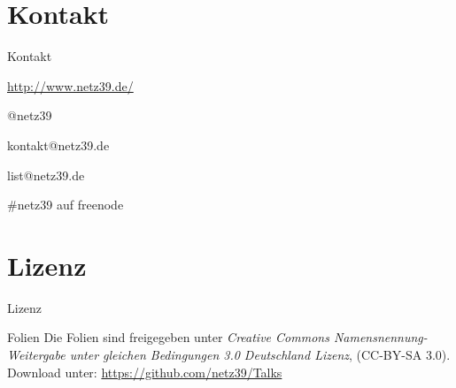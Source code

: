 \documentclass{beamer}
\begin{document}
\section{Kontakt}

\begin{frame}{Kontakt}
    \begin{center}
        \begin{description}
            \item[WWW] \url{http://www.netz39.de/}
            \item[Twitter/identi.ca] @netz39
            \item[E-Mail] kontakt@netz39.de
            \item[Mailingliste] list@netz39.de
            \item[IRC] \#netz39 auf freenode
        \end{description}
    \end{center}
\end{frame}

\appendix

\section{Lizenz}

\begin{frame}{Lizenz}
    \begin{block}{Folien}
        Die Folien sind freigegeben unter \emph{Creative Commons
        Namensnennung-Weitergabe unter gleichen Bedingungen 3.0
        Deutschland Lizenz}, (CC-BY-SA 3.0). Download unter:
        \url{https://github.com/netz39/Talks}
    \end{block}
\end{frame}
\end{document}
